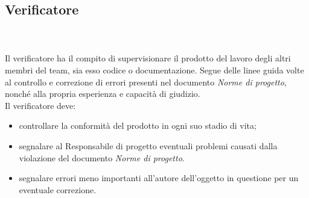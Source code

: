 			\subsection{Verificatore} \mbox{}\\ \mbox{}\\
			Il verificatore ha il compito di supervisionare il prodotto del lavoro degli altri membri del team, sia esso codice o documentazione. Segue delle linee guida volte al controllo e correzione di errori presenti nel documento \textit{Norme di progetto}, nonché alla propria esperienza e capacità di giudizio.\\
			Il verificatore deve:
			\begin{itemize}
				\item controllare la conformità del prodotto in ogni suo stadio di vita;
				\item segnalare al Responsabile di progetto eventuali problemi causati dalla violazione del documento \textit{Norme di progetto}.
				\item segnalare errori meno importanti all'autore dell'oggetto in questione per un eventuale correzione.
							\end{itemize}
		